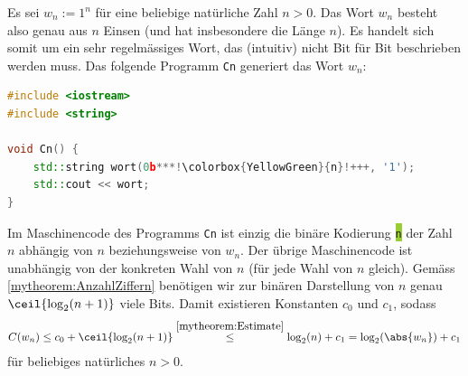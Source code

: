 \begin{myexample}\label{myexample:wn}
Es sei $w_n := 1^n$ für eine beliebige natürliche Zahl $n > 0$. Das Wort $w_n$ besteht also genau aus $n$ Einsen (und hat insbesondere die Länge $n$). Es handelt sich somit um ein sehr regelmässiges Wort, das (intuitiv) nicht Bit für Bit beschrieben werden muss. Das folgende Programm \texttt{Cn} generiert das Wort $w_n$:
\begin{lstlisting}[language=C++,escapechar=!] 
#include <iostream>
#include <string>

void Cn() {
    std::string wort(0b***!\colorbox{YellowGreen}{n}!+++, '1');
    std::cout << wort;
}
\end{lstlisting}
Im Maschinencode des Programms \texttt{Cn} ist einzig die binäre Kodierung \colorbox{YellowGreen}{\texttt{n}} der Zahl $n$ abhängig von $n$ beziehungsweise von $w_n$. Der übrige Maschinencode ist unabhängig von der konkreten Wahl von $n$ (für jede Wahl von $n$ gleich). Gemäss \cref{mytheorem:AnzahlZiffern} benötigen wir zur binären Darstellung von $n$ genau $\ceil{\log_2(n+1)}$ viele Bits. Damit existieren Konstanten $c_0$ und $c_1$, sodass
\begin{align*}
	C(w_n) \leq c_0 + \ceil{\log_2(n+1)} \stackrel{\cref{mytheorem:Estimate}}{\leq} \log_2(n) + c_1 = \log_2(\abs{w_n}) + c_1
\end{align*}
für beliebiges natürliches $n>0$.
\end{myexample}

